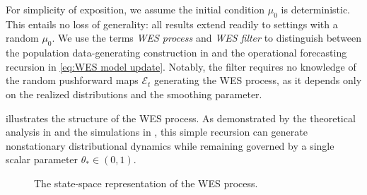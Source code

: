\documentclass[a4paper, 11pt]{article}
\newcommand{\T}{\mathcal E}
\theoremstyle{definition}
\begin{document}
For simplicity of exposition, we assume the initial condition $\mu_0$ is deterministic.
This entails no loss of generality: all results extend readily to settings with a random $\mu_0$.
We use the terms \emph{WES process} and \emph{WES filter} to distinguish between the population data-generating construction in  and the operational forecasting recursion in \eqref{eq:WES model update}.
Notably, the filter requires no knowledge of the random pushforward maps $\T_t$ generating the WES process, as it depends only on the realized distributions and the smoothing parameter.

 illustrates the structure of the WES process.
As demonstrated by the theoretical analysis in  and the simulations in , this simple recursion can generate nonstationary distributional dynamics while remaining governed by a single scalar parameter $\theta_* \in (0,1)$.

\begin{figure}[t]
\centering
{}
\caption{The state-space representation of the WES process.}\label{fig:WES demonstration}
\end{figure}
\end{document}
